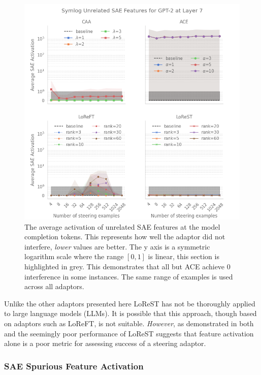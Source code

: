 \begin{figure}
    \centering
    \captionsetup{width=\textwidth}
    \includegraphics[width=\textwidth]{figures/gpt2_7_unrelated.png}
    \caption{
        The average activation of unrelated SAE features at the model completion tokens.
        This represents how well the adaptor did not interfere, \emph{lower} values are better.
        The y axis is a symmetric logarithm scale where the range $[0,1]$ is linear, this section is highlighted in grey.
        This demonstrates that all but ACE achieve 0 interference in some instances.
        The same range of examples is used across all adaptors.
    }
    \label{fig:gpt-pp-unrelated}
\end{figure}

Unlike the other adaptors presented here LoReST has not be thoroughly applied to large language models (LLMs).
It is possible that this approach, though based on adaptors such as LoReFT, is not suitable.
\emph{However}, as demonstrated in both  and  the seemingly poor performance of LoReST suggests that feature activation alone is a poor metric for assessing success of a steering adaptor.

\subsubsection{SAE Spurious Feature Activation}

